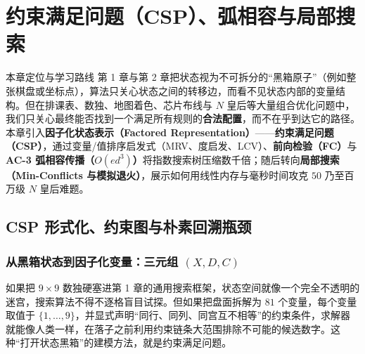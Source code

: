 \chapter[约束满足问题（CSP）与局部搜索]{约束满足问题（CSP）、弧相容与局部搜索}\label{ch:csp}

\begin{chapIntro}{本章定位与学习路线}
第 1 章与第 2 章把状态视为不可拆分的“黑箱原子”（例如整张棋盘或坐标点），算法只关心状态之间的转移边，而看不见状态内部的变量结构。但在排课表、数独、地图着色、芯片布线与 $N$ 皇后等大量组合优化问题中，我们只关心最终能否找到一个满足所有规则的\textbf{合法配置}，而不在乎到达它的路径。本章引入\textbf{因子化状态表示（Factored Representation）}——\textbf{约束满足问题（CSP）}，通过变量/值排序启发式（MRV、度启发、LCV）、\textbf{前向检验（FC）}与 \textbf{AC-3 弧相容传播（$O(ed^3)$）}将指数搜索树压缩数千倍；随后转向\textbf{局部搜索（Min-Conflicts 与模拟退火）}，展示如何用线性内存与毫秒时间攻克 $50$ 乃至百万级 $N$ 皇后难题。
\end{chapIntro}

\section{CSP 形式化、约束图与朴素回溯瓶颈}\label{sec:csp-form}

\subsection{从黑箱状态到因子化变量：三元组 $(X, D, C)$}

如果把 $9\times 9$ 数独硬塞进第 1 章的通用搜索框架，状态空间就像一个完全不透明的迷宫，搜索算法不得不逐格盲目试探。但如果把盘面拆解为 $81$ 个变量，每个变量取值于 $\{1,\dots,9\}$，并显式声明“同行、同列、同宫互不相等”的约束条件，求解器就能像人类一样，在落子之前利用约束链条大范围排除不可能的候选数字。这种“打开状态黑箱”的建模方法，就是约束满足问题。

